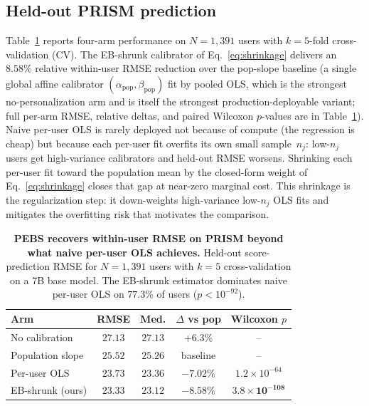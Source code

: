 \documentclass{article}
\begin{document}
\subsection{Held-out PRISM prediction}\label{sec:withinuser}
Table~\ref{tab:t1-within} reports four-arm performance on $N{=}1{,}391$
users with $k{=}5$-fold cross-validation (CV). The EB-shrunk
calibrator of Eq.~\eqref{eq:shrinkage} delivers an $\bm{8.58\%}$
relative within-user RMSE reduction over the pop-slope baseline
(a single global affine calibrator
$(\alpha_{\mathrm{pop}}, \beta_{\mathrm{pop}})$ fit by pooled OLS,
which is the strongest no-personalization arm and is itself the
strongest production-deployable variant; full per-arm RMSE,
relative deltas, and paired Wilcoxon $p$-values are in
Table~\ref{tab:t1-within}). Naive per-user OLS is rarely deployed
not because of compute (the regression is cheap) but because each
per-user fit overfits its own small sample~$n_j$: low-$n_j$ users
get high-variance calibrators and held-out RMSE worsens. Shrinking
each per-user fit toward the population mean by the closed-form
weight of Eq.~\eqref{eq:shrinkage} closes that gap at near-zero
marginal cost. This shrinkage is the regularization step: it
down-weights high-variance low-$n_j$ OLS fits and mitigates the
overfitting risk that motivates the comparison.

\begin{table}[htbp]
\caption{\textbf{PEBS recovers within-user RMSE on PRISM beyond
what naive per-user OLS achieves.} Held-out score-prediction
RMSE for $N{=}1{,}391$ users with $k{=}5$ cross-validation on a 7B
base model. The EB-shrunk estimator dominates naive per-user OLS on
$77.3\%$ of users ($p{<}10^{-92}$).}\label{tab:t1-within}
\centering
\footnotesize
\setlength{\tabcolsep}{3pt}
\begin{tabular}{lcccc}
\toprule
Arm & RMSE & Med. & $\Delta$ vs pop & Wilcoxon $p$ \\
\midrule
No calibration    & $27.13$      & $27.13$ & $+6.3\%$        & --                      \\
Population slope  & $25.52$      & $25.26$ & baseline        & --                      \\
Per-user OLS      & $23.73$      & $23.36$ & $-7.02\%$       & $1.2{\times}10^{-64}$   \\
EB-shrunk (ours)  & $\bm{23.33}$ & $23.12$ & $\bm{-8.58\%}$  & $\bm{3.8{\times}10^{-108}}$ \\
\bottomrule
\end{tabular}
\end{table}
\end{document}
